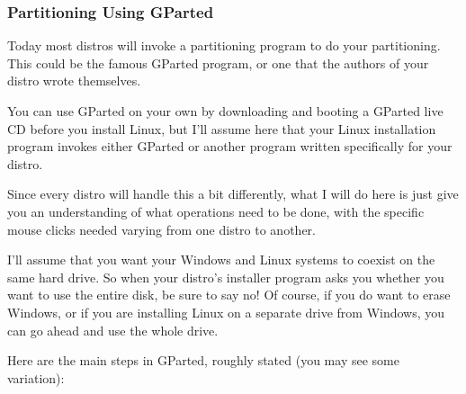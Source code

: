 \documentclass[11pt]{article}
\begin{document}
\subsubsection{Partitioning Using GParted}

Today most distros will invoke a partitioning program to do your
partitioning.  This could be the famous GParted program, or one that the
authors of your distro wrote themselves.

You can use GParted on your own by downloading and booting a GParted
live CD before you install Linux, but I'll assume here that your Linux
installation program invokes either GParted or another program written
specifically for your distro.

Since every distro will handle this a bit differently, what I will do
here is just give you an understanding of what operations need to be
done, with the specific mouse clicks needed varying from one distro to
another.

I'll assume that you want your Windows and Linux systems to coexist on
the same hard drive.  So when your distro's installer program asks you
whether you want to use the entire disk, be sure to say no!  Of course,
if you do want to erase Windows, or if you are installing Linux on a
separate drive from Windows, you can go ahead and use the whole drive.


Here are the main steps in GParted, roughly stated (you may see some
variation):
\end{document}

